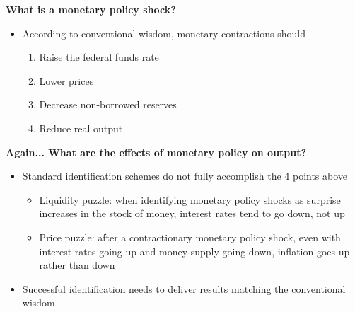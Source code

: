 \documentclass[10pt,handout]{beamer}
\begin{document}
\begin{frame}
{\textbf{What is a monetary policy shock?}}

\begin{itemize}
\item According to conventional wisdom, monetary contractions should
\smallskip

\begin{enumerate}
\item Raise the federal funds rate\smallskip \pause

\item Lower prices\smallskip \pause

\item Decrease non-borrowed reserves\smallskip \pause

\item Reduce real output
\end{enumerate}
\end{itemize}
\end{frame}

\vspace{.1cm}

\begin{frame}
{\textbf{Again... What are the effects of monetary policy on output?}}

\begin{itemize}
\item Standard identification schemes do not fully accomplish the 4 points
above\medskip

\begin{itemize}
\item {{\color{red} Liquidity puzzle}}: when identifying monetary policy
shocks as surprise increases in the stock of money, interest rates tend to
go down, not up\smallskip \pause

\item {{\color{red} Price puzzle}}: after a contractionary monetary policy
shock, even with interest rates going up and money supply going down,
inflation goes up rather than down\bigskip \pause
\end{itemize}

\item Successful identification needs to deliver results matching the
conventional wisdom
\end{itemize}
\end{frame}

\vspace{.1cm}
\end{document}
